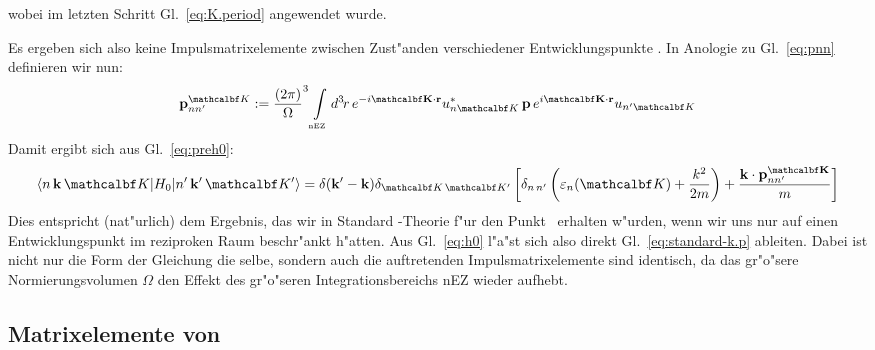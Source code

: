 %
wobei im letzten Schritt Gl.~\eqref{eq:K.period} angewendet wurde.

Es ergeben sich also keine Impulsmatrixelemente zwischen Zust"anden
verschiedener Entwicklungspunkte {\set}. In Anologie zu Gl.~\eqref{eq:pnn}
definieren wir nun:
%
\begin{equation}
  \label{eq:pnnK}
  \pnnK := {\frac{(2\pi)}{\Omega}}^{3} \bzint{nEZ} \vdx{r}
  e^{-i\sprod{\set}{r}} \cc{u_{n\set}} \, \op{\vec{p}}  \,
  e^{i\sprod{\set}{r}} u_{\pri{n}\set}
\end{equation}
%
Damit ergibt sich aus Gl.~\eqref{eq:preh0}:
%
\begin{equation}
  \label{eq:h0}
  \matrixel{\varbasis}{\op{H_{0}}}{\pvarbasis} 
  = \delta(\pri{\nk}-\nk) \kronecker{\set}{\pri{\set}} \left[
  \kronecker{n}{\pri{n}} \left( \veps_{n}(\set) + \frac{k^{2}}{2m}
  \right) + \frac{\sprod{k}{\pnnK}}{m} \right]
\end{equation}
%
Dies entspricht (nat"urlich) dem Ergebnis, das wir in Standard \kdotp-Theorie
f"ur den Punkt \set\ erhalten w"urden, wenn wir uns nur auf einen
Entwicklungspunkt im reziproken Raum beschr"ankt h"atten. Aus
Gl.~\eqref{eq:h0} l"a"st sich also direkt Gl.~\eqref{eq:standard-k.p} ableiten.
Dabei ist nicht nur die Form der Gleichung die selbe, sondern
auch die auftretenden Impulsmatrixelemente sind identisch, da das gr"o"sere
Normierungsvolumen $\Omega$ den Effekt des gr"o"seren Integrationsbereichs nEZ
wieder aufhebt.


\subsection{Matrixelemente von }
\label{sec:h1}

